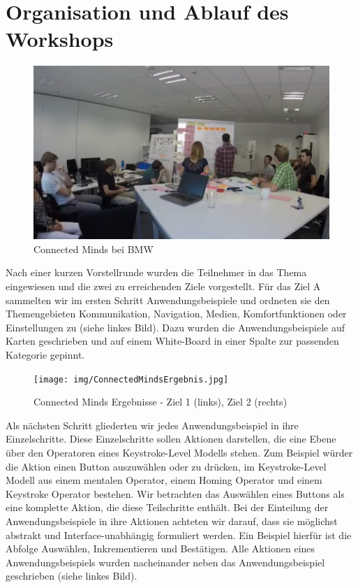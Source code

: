 \section[Ablauf]{Organisation und Ablauf des Workshops}
\begin{figure}[ht]
  \centering
  \includegraphics[width=1\textwidth]{img/ConnectedMind.jpg}
  \caption{Connected Minds bei BMW}
  \label{fig:ConnectedMind}
\end{figure} 
Nach einer kurzen Vorstellrunde wurden die Teilnehmer in das Thema eingewiesen und die zwei zu erreichenden Ziele vorgestellt. 
Für das Ziel A sammelten wir im ersten Schritt Anwendungsbeispiele und ordneten sie den Themengebieten Kommunikation, Navigation, Medien, Komfortfunktionen oder Einstellungen zu (siehe  linkes Bild). Dazu wurden die Anwendungsbeispiele auf Karten geschrieben und auf einem White-Board in einer Spalte zur passenden Kategorie gepinnt.
\begin{figure}[ht]
  \centering
  \texttt{[image: img/ConnectedMindsErgebnis.jpg]}
  \caption[Connected Minds Ergebnisse]{Connected Minds Ergebnisse - Ziel 1 (links), Ziel 2 (rechts)}
  \label{fig:ConnectedMindErgebnisse}
\end{figure}  

Als nächsten Schritt gliederten wir jedes Anwendungsbeispiel in ihre Einzelschritte. 
Diese Einzelschritte sollen Aktionen darstellen, die eine Ebene über den Operatoren eines Keystroke-Level Modells stehen. 
Zum Beispiel würder die Aktion einen Button auszuwählen oder zu drücken, im Keystroke-Level Modell aus einem mentalen Operator, einem Homing Operator und einem Keystroke Operator bestehen. 
Wir betrachten das Auswählen eines Buttons als eine komplette Aktion, die diese Teilschritte enthält. 
Bei der Einteilung der Anwendungsbeispiele in ihre Aktionen achteten wir darauf, dass sie möglichst abstrakt und Interface-unabhängig formuliert werden. 
Ein Beispiel hierfür ist die Abfolge Auswählen, Inkrementieren und Bestätigen.
Alle Aktionen eines Anwendungsbeispiels wurden nacheinander neben das Anwendungsbeispiel geschrieben (siehe  linkes Bild). 

